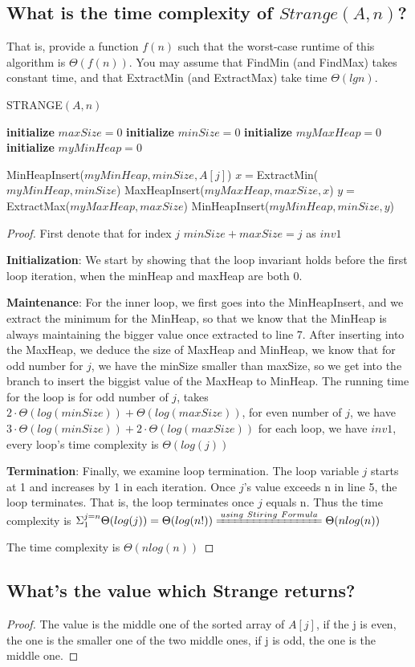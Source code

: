 \documentclass[a4paper]{article}
\begin{document}
\subsection{What is the time complexity of $Strange(A, n)$? }
That is, provide a function $f(n)$
such that the worst-case runtime of this algorithm is $\Theta( f(n) )$. You may assume that FindMin (and FindMax) takes constant time, and that ExtractMin (and
ExtractMax) take time $\Theta(lg n)$.
\begin{algorithm}
  \caption{STRANGE$(A,n)$}\label{alg:cap5}
  \begin{algorithmic}[1]
    \State \textbf{initialize} $maxSize=0$
    \State \textbf{initialize} $minSize=0$
    \State \textbf{initialize} $myMaxHeap=0$
    \State \textbf{initialize} $myMinHeap=0$

    \State MinHeapInsert($myMinHeap,minSize,A[j]$)
    \State $x=$ExtractMin($myMinHeap,minSize$)
    \State MaxHeapInsert($myMaxHeap,maxSize,x$)
    \State $y=$ExtractMax($myMaxHeap,maxSize$)
    \State MinHeapInsert($myMinHeap,minSize,y$)
    \EndIf
    \EndFor
  \end{algorithmic}
\end{algorithm}
\begin{proof}
  First denote that for index $j$ $minSize+maxSize = j$ as $inv1$

  \textbf{Initialization}: We start by showing that the loop invariant holds before the first loop iteration, when the minHeap and maxHeap are both 0.

  \textbf{Maintenance}: For the inner loop, we first goes into the MinHeapInsert, and we extract the minimum for the MinHeap, so that we know that the MinHeap is always maintaining the bigger value once extracted to line 7. After inserting into the MaxHeap, we deduce the size of MaxHeap and MinHeap, we know that for odd number for $j$, we have the minSize smaller than maxSize, so we get into the branch to insert the biggist value of the MaxHeap to MinHeap. The running time for the loop is for odd number of $j$, takes $2\cdot \Theta(log (minSize))+\Theta(log(maxSize))$, for even number of $j$, we have $3\cdot \Theta(log (minSize))+2\cdot\Theta(log(maxSize))$ for each loop, we have $inv1$, every loop's time complexity is $\Theta(log(j))$

  \textbf{Termination}: Finally, we examine loop termination. The loop variable $j$ starts at 1 and increases by 1 in each iteration. Once $j$'s value exceeds
  n in line 5, the loop terminates. That is, the loop terminates once $j$
  equals n. Thus the time complexity is $\Sigma _1^{j=n} \Theta(log(j))= \Theta(log(n!))\xlongequal{using\ Stiring\ Formula} \Theta(nlog(n))$

  The time complexity is $\Theta(nlog(n))$
\end{proof}

\subsection{What's the value which Strange returns?}
\begin{proof}
The value is the middle one of the sorted array of $A[j]$, if the j is even, the one is the smaller one of the two middle ones, if j is odd, the one is the middle one.
\end{proof}
\end{document}
